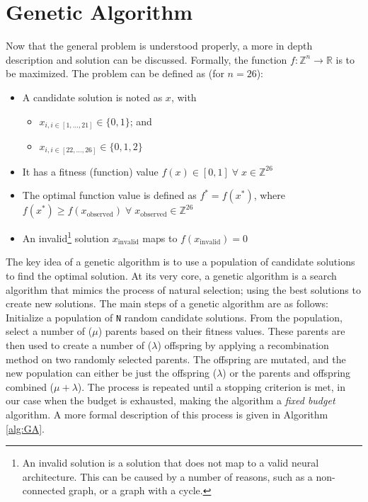 \documentclass{article}
\begin{document}
\section{Genetic Algorithm}
\label{sec:GA}

Now that the general problem is understood properly, a more in depth description and solution can be discussed.
Formally, the function $f: \mathbb{Z}^n \rightarrow \mathbb{R}$ is to be maximized.
The problem can be defined as (for $n=26$):

\begin{itemize}
    \item A candidate solution is noted as $x$, with
    \begin{itemize}
        \item $x_{i, i \in [1, \dots, 21]} \in \{0, 1\}$; and
        \item $x_{i, i \in [22, \dots, 26]} \in \{0, 1, 2\}$
    \end{itemize}
    \item It has a fitness (function) value $f(x) \in [0, 1] \; \forall \; x \in \mathbb{Z}^{26}$
    \item The optimal function value is defined as $f^* = f(x^*)$, where $f(x^*) \geq f(x_{\mathrm{observed}}) \; \forall \; x_{\mathrm{observed}} \in \mathbb{Z}^{26}$
    \item An invalid\footnote{
        An invalid solution is a solution that does not map to a valid neural architecture. 
        This can be caused by a number of reasons, such as a non-connected graph, or a graph with a cycle.
        } solution $x_{\mathrm{invalid}}$ maps to $f(x_{\mathrm{invalid}})=0$
\end{itemize}

The key idea of a genetic algorithm is to use a population of candidate solutions to find the optimal solution.
At its very core, a genetic algorithm is a search algorithm that mimics the process of natural selection; using the best solutions to create new solutions.
The main steps of a genetic algorithm are as follows:
Initialize a population of \texttt{N} random candidate solutions.
From the population, select a number of ($\mu$) parents based on their fitness values.
These parents are then used to create a number of ($\lambda$) offspring by applying a recombination method on two randomly selected parents.
The offspring are mutated, and the new population can either be just the offspring ($\lambda$) or the parents and offspring combined ($\mu+\lambda$).
The process is repeated until a stopping criterion is met, in our case when the budget is exhausted, making the algorithm a \textit{fixed budget} algorithm.
A more formal description of this process is given in Algorithm \ref{alg:GA}.
\end{document}
